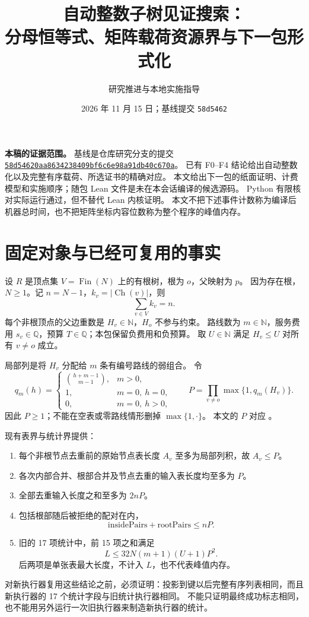 \documentclass[UTF8,11pt,a4paper]{ctexart}
\title{自动整数子树见证搜索：\protect\\ 分母恒等式、矩阵载荷资源界与下一包形式化}
\author{研究推进与本地实施指导}
\date{2026 年 11 月 15 日；基线提交 \texttt{58d5462}}
\theoremstyle{definition}
\newcommand{\N}{\mathbb N}
\newcommand{\Q}{\mathbb Q}
\newcommand{\ch}{\operatorname{Ch}}
\newcommand{\abs}[1]{\left|#1\right|}
\newcommand{\code}[1]{\texttt{\detokenize{#1}}}
\begin{document}
\maketitle

\noindent\textbf{本稿的证据范围。}
基线是仓库研究分支的提交
\href{https://github.com/huam54925-cpu/uav-routing-certification/commit/58d54620aa8634238409bf6c6e98a91db40c670a}{\texttt{58d54620aa8634238409bf6c6e98a91db40c670a}}。
已有 F0--F4 结论给出自动整数化以及完整有序载荷、所选证书的精确对应。
本文给出下一包的纸面证明、计费模型和实施顺序；随包 Lean 文件是未在本会话编译的候选源码。
Python 有限核对实际运行通过，但不替代 Lean 内核证明。
本文不把下述事件计数称为编译后机器总时间，也不把矩阵坐标内容位数称为整个程序的峰值内存。

\section{固定对象与已经可复用的事实}
设 $R$ 是顶点集 $V=\operatorname{Fin}(N)$ 上的有根树，根为 $o$，父映射为 $p$。
因为存在根，$N\ge1$。记 $n=N-1$，$k_v=\abs{\ch(v)}$，则
\begin{equation}\label{eq:degree}
  \sum_{v\in V} k_v=n.
\end{equation}
每个非根顶点的父边重数是 $H_v\in\N$，$H_o$ 不参与约束。
路线数为 $m\in\N$，服务费用 $s_v\in\Q$，预算 $T\in\Q$；本包保留负费用和负预算。
取 $U\in\N$ 满足 $H_v\le U$ 对所有 $v\ne o$ 成立。

局部列是将 $H_v$ 分配给 $m$ 条有编号路线的弱组合。
令
\[
 q_m(h)=
 \begin{cases}
  \binom{h+m-1}{m-1},&m>0,\\
  1,&m=0,\ h=0,\\
  0,&m=0,\ h>0,
 \end{cases}
 \qquad
 P=\prod_{v\ne o}\max\{1,q_m(H_v)\}.
\]
因此 $P\ge1$；不能在空表或零路线情形删掉 $\max\{1,\cdot\}$。
本文的 $P$ 对应 \code{globalProduct R H m}。

现有表界与统计界提供：
\begin{enumerate}
\item 每个非根节点去重前的原始节点表长度 $A_v$ 至多为局部列积，故 $A_v\le P$。
\item 各次内部合并、根部合并及节点去重的输入表长度均至多为 $P$。
\item 全部去重输入长度之和至多为 $2nP$。
\item 包括根部随后被拒绝的配对在内，
\[
 \mathrm{insidePairs}+\mathrm{rootPairs}\le nP.
\]
\item 旧的 17 项统计中，前 15 项之和满足
\begin{equation}\label{eq:old}
 L\le 32N(m+1)(U+1)P^2.
\end{equation}
后两项是单张表最大长度，不计入 $L$，也不代表峰值内存。
\end{enumerate}
对新执行器复用这些结论之前，必须证明：投影到键以后完整有序列表相同，而且新执行器的 17 个统计字段与旧统计执行器相同。
不能只证明最终成功标志相同，也不能用另外运行一次旧执行器来制造新执行器的统计。
\end{document}
